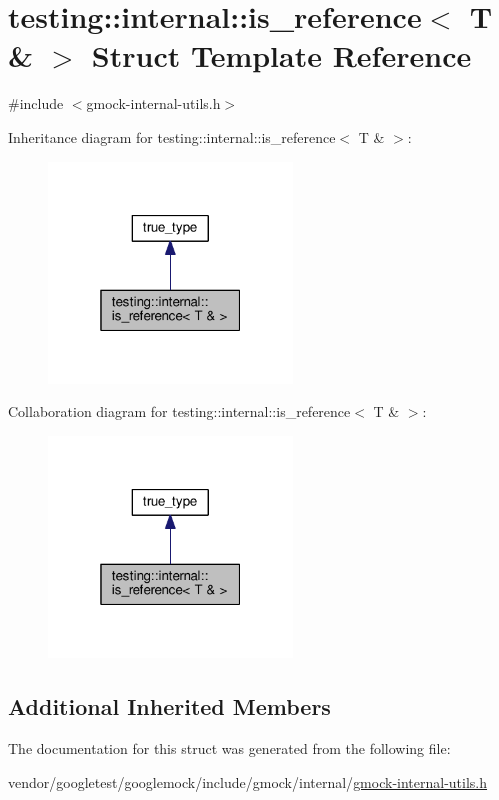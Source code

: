 \hypertarget{structtesting_1_1internal_1_1is__reference_3_01T_01_6_01_4}{}\section{testing\+:\+:internal\+:\+:is\+\_\+reference$<$ T \& $>$ Struct Template Reference}
\label{structtesting_1_1internal_1_1is__reference_3_01T_01_6_01_4}


{\ttfamily \#include $<$gmock-\/internal-\/utils.\+h$>$}



Inheritance diagram for testing\+:\+:internal\+:\+:is\+\_\+reference$<$ T \& $>$\+:
\nopagebreak
\begin{figure}[H]
\begin{center}
\leavevmode
\includegraphics[width=184pt]{structtesting_1_1internal_1_1is__reference_3_01T_01_6_01_4__inherit__graph}
\end{center}
\end{figure}


Collaboration diagram for testing\+:\+:internal\+:\+:is\+\_\+reference$<$ T \& $>$\+:
\nopagebreak
\begin{figure}[H]
\begin{center}
\leavevmode
\includegraphics[width=184pt]{structtesting_1_1internal_1_1is__reference_3_01T_01_6_01_4__coll__graph}
\end{center}
\end{figure}
\subsection*{Additional Inherited Members}


The documentation for this struct was generated from the following file\+:\begin{DoxyCompactItemize}
\item 
vendor/googletest/googlemock/include/gmock/internal/\hyperlink{gmock-internal-utils_8h}{gmock-\/internal-\/utils.\+h}\end{DoxyCompactItemize}
